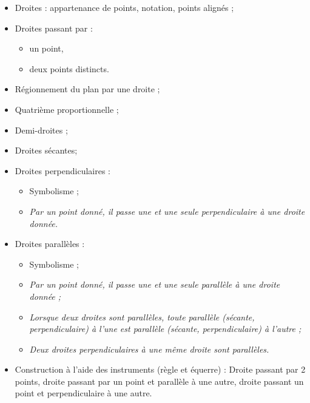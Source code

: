 \savoir
\begin{itemize}
\item Droites : appartenance de points, notation, points alignés ;
\item Droites passant par :
\begin{itemize}
\item un point,
\item deux points distincts.
\end{itemize}
\item Régionnement du plan par une droite ;
\item Quatrième proportionnelle ;
\item Demi-droites ;
\item Droites sécantes;
\item Droites perpendiculaires :
\begin{itemize}
\item Symbolisme ;
\item \textit{Par un point donné, il passe une et une seule perpendiculaire à une droite donnée.}
\end{itemize}
\item Droites parallèles :
\begin{itemize}
\item Symbolisme ;
\item\textit{ Par un point donné, il passe une et une seule parallèle à une droite donnée ;}
\item \textit{Lorsque deux droites sont parallèles, toute parallèle (sécante, perpendiculaire)
à l'une est parallèle (sécante, perpendiculaire) à l'autre ;}
\item \textit{Deux droites perpendiculaires à une même droite sont parallèles.}
\end{itemize}
\end{itemize}
\savoirfaire
\begin{itemize}
\item Construction à l'aide des instruments (règle et équerre) :
Droite passant par 2 points, droite passant par un point et parallèle à une autre, droite passant un point et perpendiculaire à une autre.
\end{itemize}

\subsection*{}

